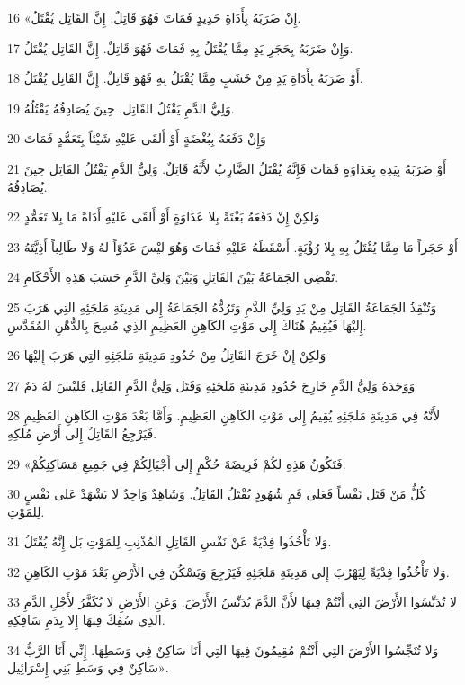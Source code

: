 \par 16 «إِنْ ضَرَبَهُ بِأَدَاةِ حَدِيدٍ فَمَاتَ فَهُوَ قَاتِلٌ. إِنَّ القَاتِل يُقْتَلُ.
\par 17 وَإِنْ ضَرَبَهُ بِحَجَرِ يَدٍ مِمَّا يُقْتَلُ بِهِ فَمَاتَ فَهُوَ قَاتِلٌ. إِنَّ القَاتِل يُقْتَلُ.
\par 18 أَوْ ضَرَبَهُ بِأَدَاةِ يَدٍ مِنْ خَشَبٍ مِمَّا يُقْتَلُ بِهِ فَهُوَ قَاتِلٌ. إِنَّ القَاتِل يُقْتَلُ.
\par 19 وَلِيُّ الدَّمِ يَقْتُلُ القَاتِل. حِينَ يُصَادِفُهُ يَقْتُلُهُ.
\par 20 وَإِنْ دَفَعَهُ بِبُغْضَةٍ أَوْ أَلقَى عَليْهِ شَيْئاً بِتَعَمُّدٍ فَمَاتَ
\par 21 أَوْ ضَرَبَهُ بِيَدِهِ بِعَدَاوَةٍ فَمَاتَ فَإِنَّهُ يُقْتَلُ الضَّارِبُ لأَنَّهُ قَاتِلٌ. وَلِيُّ الدَّمِ يَقْتُلُ القَاتِل حِينَ يُصَادِفُهُ.
\par 22 وَلكِنْ إِنْ دَفَعَهُ بَغْتَةً بِلا عَدَاوَةٍ أَوْ أَلقَى عَليْهِ أَدَاةً مَا بِلا تَعَمُّدٍ
\par 23 أَوْ حَجَراً مَا مِمَّا يُقْتَلُ بِهِ بِلا رُؤْيَةٍ. أَسْقَطَهُ عَليْهِ فَمَاتَ وَهُوَ ليْسَ عَدُوّاً لهُ وَلا طَالِباً أَذِيَّتَهُ
\par 24 تَقْضِي الجَمَاعَةُ بَيْنَ القَاتِلِ وَبَيْنَ وَلِيِّ الدَّمِ حَسَبَ هَذِهِ الأَحْكَامِ.
\par 25 وَتُنْقِذُ الجَمَاعَةُ القَاتِل مِنْ يَدِ وَلِيِّ الدَّمِ وَتَرُدُّهُ الجَمَاعَةُ إِلى مَدِينَةِ مَلجَئِهِ التِي هَرَبَ إِليْهَا فَيُقِيمُ هُنَاكَ إِلى مَوْتِ الكَاهِنِ العَظِيمِ الذِي مُسِحَ بِالدُّهْنِ المُقَدَّسِ.
\par 26 وَلكِنْ إِنْ خَرَجَ القَاتِلُ مِنْ حُدُودِ مَدِينَةِ مَلجَئِهِ التِي هَرَبَ إِليْهَا
\par 27 وَوَجَدَهُ وَلِيُّ الدَّمِ خَارِجَ حُدُودِ مَدِينَةِ مَلجَئِهِ وَقَتَل وَلِيُّ الدَّمِ القَاتِل فَليْسَ لهُ دَمٌ
\par 28 لأَنَّهُ فِي مَدِينَةِ مَلجَئِهِ يُقِيمُ إِلى مَوْتِ الكَاهِنِ العَظِيمِ. وَأَمَّا بَعْدَ مَوْتِ الكَاهِنِ العَظِيمِ فَيَرْجِعُ القَاتِلُ إِلى أَرْضِ مُلكِهِ.
\par 29 «فَتَكُونُ هَذِهِ لكُمْ فَرِيضَةَ حُكْمٍ إِلى أَجْيَالِكُمْ فِي جَمِيعِ مَسَاكِنِكُمْ.
\par 30 كُلُّ مَنْ قَتَل نَفْساً فَعَلى فَمِ شُهُودٍ يُقْتَلُ القَاتِلُ. وَشَاهِدٌ وَاحِدٌ لا يَشْهَدْ عَلى نَفْسٍ لِلمَوْتِ.
\par 31 وَلا تَأْخُذُوا فِدْيَةً عَنْ نَفْسِ القَاتِلِ المُذْنِبِ لِلمَوْتِ بَل إِنَّهُ يُقْتَلُ.
\par 32 وَلا تَأْخُذُوا فِدْيَةً لِيَهْرُبَ إِلى مَدِينَةِ مَلجَئِهِ فَيَرْجِعَ وَيَسْكُنَ فِي الأَرْضِ بَعْدَ مَوْتِ الكَاهِنِ.
\par 33 لا تُدَنِّسُوا الأَرْضَ التِي أَنْتُمْ فِيهَا لأَنَّ الدَّمَ يُدَنِّسُ الأَرْضَ. وَعَنِ الأَرْضِ لا يُكَفَّرُ لأَجْلِ الدَّمِ الذِي سُفِكَ فِيهَا إِلا بِدَمِ سَافِكِهِ.
\par 34 وَلا تُنَجِّسُوا الأَرْضَ التِي أَنْتُمْ مُقِيمُونَ فِيهَا التِي أَنَا سَاكِنٌ فِي وَسَطِهَا. إِنِّي أَنَا الرَّبُّ سَاكِنٌ فِي وَسَطِ بَنِي إِسْرَائِيل».


